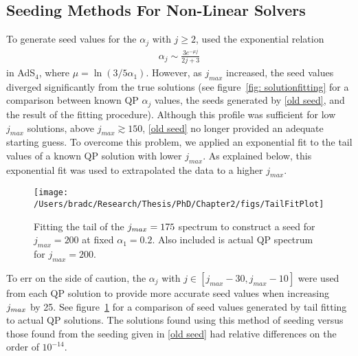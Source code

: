 \documentclass[../PhD.tex]{subfiles}
\begin{document}
\begin{subappendices}


\vspace{-0.15in}

\section{Seeding Methods For Non-Linear Solvers}
\label{app: seeding}
To generate seed values for the $\alpha_j$ with $j \geq 2$, \cite{1507.08261} used the exponential relation
\begin{align}
\label{old seed}
\alpha_j \sim \frac{3 e^{-\mu j}}{2j + 3}
\end{align}
in AdS$_4$, where $\mu = \ln (3 / 5 \alpha_1 )$. However, as $j_{max}$ increased, the seed values diverged significantly from the true solutions (see figure~\ref{fig: solutionfitting} for a comparison between known QP $\alpha_j$ values, the seeds generated by \eqref{old seed}, and the result of the fitting procedure). Although this profile was sufficient for low $j_{max}$ solutions, above $j_{max} \gtrsim 150$, \eqref{old seed} no longer provided an adequate starting guess. To overcome this problem, we applied an exponential fit to the tail values of a known QP solution with lower $j_{max}$. As explained below, this exponential fit was used to extrapolated the data to a higher $j_{max}$. 

\begin{figure}
	\centering
	\texttt{[image: /Users/bradc/Research/Thesis/PhD/Chapter2/figs/TailFitPlot]}
	\caption{Fitting the tail of the ${j_{max} = 175}$ spectrum to construct a seed for ${j_{max} = 200}$ at fixed ${\alpha_1 = 0.2}$. Also included is actual QP spectrum for ${j_{max} = 200}$.}
  	\label{fig: tail fitting}
\end{figure}
	
To err on the side of caution, the $\alpha_j$ with ${j \in [ j_{max} - 30, j_{max} - 10]}$ were used from each QP solution to provide more accurate seed values when increasing $j_{max}$ by 25. See figure~\ref{fig: tail fitting} for a comparison of seed values generated by tail fitting to actual QP solutions. The solutions found using this method of seeding versus those found from the seeding given in \eqref{old seed} had relative differences on the order of $10^{-14}$.


\end{subappendices}
\end{document}
